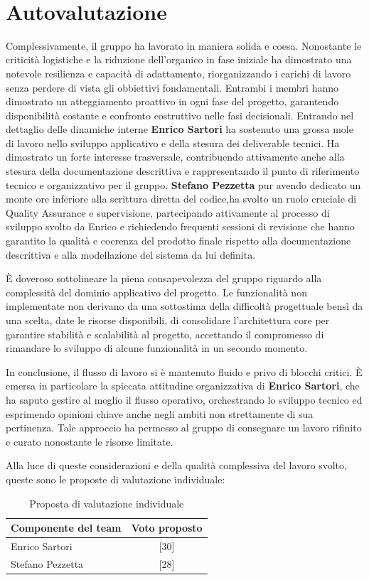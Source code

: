 \setcounter{section}{4}
\setlength{\parindent}{0pt}  %
\setlength{\parskip}{6pt}
\section{Autovalutazione}

Complessivamente, il gruppo ha lavorato in maniera solida e coesa. Nonostante le criticità logistiche e la riduzione dell'organico in fase iniziale ha dimostrato una notevole resilienza e capacità di adattamento, riorganizzando i carichi di lavoro senza perdere di vista gli obbiettivi fondamentali.
Entrambi i membri hanno dimostrato un atteggiamento proattivo in ogni fase del progetto, garantendo disponibilità costante e confronto costruttivo nelle fasi decisionali.
Entrando nel dettaglio delle dinamiche interne \textbf{Enrico Sartori} ha sostenuto una grossa mole di lavoro nello sviluppo applicativo e della stesura dei deliverable tecnici. Ha dimostrato un forte interesse trasversale, contribuendo attivamente anche alla stesura della documentazione descrittiva e rappresentando il punto di riferimento tecnico e organizzativo per il gruppo.
\textbf{Stefano Pezzetta} pur avendo dedicato un monte ore inferiore alla scrittura diretta del codice,ha svolto un ruolo cruciale di Quality Assurance e supervisione, partecipando attivamente al processo di sviluppo svolto da Enrico e richiedendo frequenti sessioni di revisione che hanno garantito la qualità e coerenza del prodotto finale rispetto alla documentazione descrittiva e alla modellazione del sistema da lui definita.

È doveroso sottolineare la piena consapevolezza del gruppo riguardo alla complessità del dominio applicativo del progetto. Le funzionalità non implementate non derivano da una sottostima della difficoltà progettuale bensì da una scelta, date le risorse disponibili, di consolidare l'architettura core per garantire stabilità e scalabilità al progetto, accettando il compromesso di rimandare lo sviluppo di alcune funzionalità in un secondo momento.

In conclusione, il flusso di lavoro si è mantenuto fluido e privo di blocchi critici.
È emersa in particolare la spiccata attitudine organizzativa di \textbf{Enrico Sartori}, che ha saputo gestire al meglio il flusso operativo, orchestrando lo sviluppo tecnico ed esprimendo opinioni chiave anche negli ambiti non strettamente di sua pertinenza. Tale approccio ha permesso al gruppo di consegnare un lavoro rifinito e curato nonostante le risorse limitate.

Alla luce di queste considerazioni e della qualità complessiva del lavoro svolto, queste sono le proposte di valutazione individuale:
\begin{table}[H]
\centering
\renewcommand{\arraystretch}{1.5}
\begin{tabular}{|l|c|}
\hline
\textbf{Componente del team} & \textbf{Voto proposto} \\ \hline
Enrico Sartori      & [30] \\ \hline
Stefano Pezzetta    & [28] \\ \hline
\end{tabular}
\caption{Proposta di valutazione individuale}
\label{tab:voti}
\end{table}